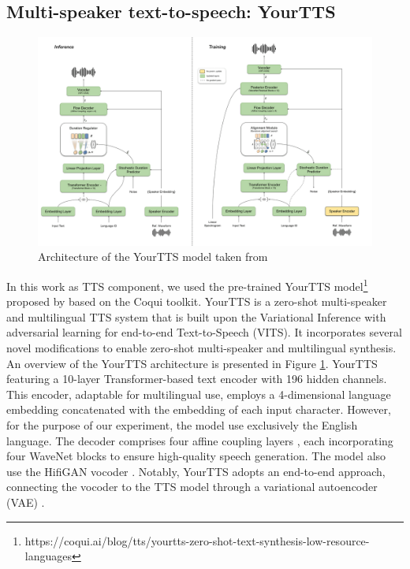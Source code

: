 \subsection{Multi-speaker text-to-speech: YourTTS}

\begin{figure}
    \begin{center}
        \includegraphics[scale=0.4]{imgs/yourtts.png}
        \caption{Architecture of the YourTTS model taken from \cite{casanova2022yourtts}}
        \label{fig:yourtts}
    \end{center}
\end{figure}

In this work as TTS component, we used the pre-trained YourTTS model\footnote{https://coqui.ai/blog/tts/yourtts-zero-shot-text-synthesis-low-resource-languages} proposed by \cite{casanova2022yourtts} based on the  Coqui toolkit. YourTTS is a zero-shot multi-speaker and multilingual TTS system that is built upon the Variational Inference with adversarial learning for end-to-end Text-to-Speech (VITS). It incorporates several novel modifications to enable zero-shot multi-speaker and multilingual synthesis. An overview of the YourTTS architecture is presented in Figure \ref{fig:yourtts}.
YourTTS featuring a 10-layer Transformer-based text encoder with 196 hidden channels. This encoder, adaptable for multilingual use, employs a 4-dimensional language embedding concatenated with the embedding of each input character. However, for the purpose of our experiment, the model use exclusively the English language. The decoder comprises four affine coupling layers \cite{45819}, each incorporating four WaveNet blocks \cite{45774} to ensure high-quality speech generation. The model also use the HifiGAN vocoder \cite{kong2020hifi}. Notably, YourTTS adopts an end-to-end approach, connecting the vocoder to the TTS model through a variational autoencoder (VAE) \cite{VAE}.

